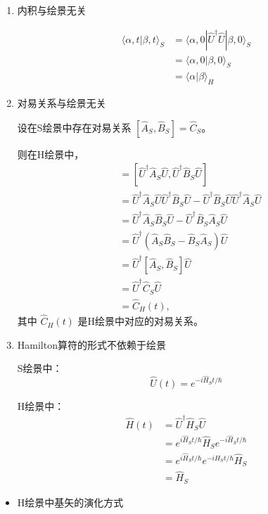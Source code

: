 \documentclass[lang=cn,15pt]{elegantbook}
\begin{document}
\begin{enumerate}
	\item  内积与绘景无关
	
	\begin{align*}
		\langle \alpha, t | \beta, t \rangle_{S} &= \langle \alpha, 0 | \hat{U}^\dagger \hat{U} | \beta, 0 \rangle_{S} \\
		&= \langle \alpha, 0 | \beta, 0 \rangle_{S} \\
		&= \langle \alpha | \beta \rangle_{H}
	\end{align*}
	
	\item 对易关系与绘景无关
	
	设在S绘景中存在对易关系 \([ \hat{A}_S, \hat{B}_S ] = \hat{C}_S\)。
	
	则在H绘景中，
	\begin{align*}
		[\hat{A}_H(t), \hat{B}_H(t)] &= [\hat{U}^\dagger \hat{A}_S \hat{U}, \hat{U}^\dagger \hat{B}_S \hat{U}] \\
		&= \hat{U}^\dagger \hat{A}_S \hat{U} \hat{U}^\dagger \hat{B}_S \hat{U} - \hat{U}^\dagger \hat{B}_S \hat{U} \hat{U}^\dagger \hat{A}_S \hat{U} \\
		&= \hat{U}^\dagger \hat{A}_S \hat{B}_S \hat{U} - \hat{U}^\dagger \hat{B}_S \hat{A}_S \hat{U} \\
		&= \hat{U}^\dagger (\hat{A}_S \hat{B}_S - \hat{B}_S \hat{A}_S) \hat{U} \\
		&= \hat{U}^\dagger [\hat{A}_S, \hat{B}_S] \hat{U} \\
		&= \hat{U}^\dagger \hat{C}_S \hat{U} \\
		&= \hat{C}_H(t),
	\end{align*}
	其中 \(\hat{C}_H(t)\) 是H绘景中对应的对易关系。
	
	\item Hamilton算符的形式不依赖于绘景
	
	S绘景中：
	\[ \hat{U}(t) = e^{-i \hat{H}_S t / \hbar} \]
	
	H绘景中：
	\begin{align*}
		\hat{H}(t) &= \hat{U}^\dagger \hat{H}_S \hat{U} \\
		&= e^{i \hat{H}_S t / \hbar} \hat{H}_S e^{-i \hat{H}_S t / \hbar} \\
		&= e^{i \hat{H}_S t / \hbar} e^{-i \hat{H}_S t / \hbar} \hat{H}_S \\
		&= \hat{H}_S
	\end{align*}
	
\end{enumerate}
\begin{itemize}
	\item H绘景中基矢的演化方式
\end{itemize}
\end{document}
